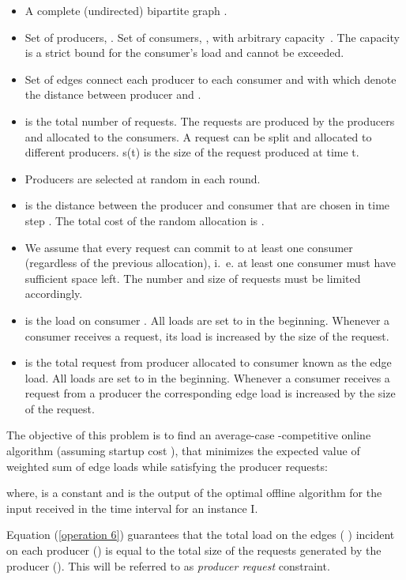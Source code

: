 \documentclass{llncs}
\begin{document}
\begin{itemize}
\item A complete (undirected) bipartite graph .
\item Set  of producers, . Set  of consumers, , with arbitrary capacity~. The capacity is a strict bound for the consumer's load and cannot be exceeded.
\item Set of edges  connect each producer to each consumer and with  which denote the distance between producer  and .
\item  is the total number of requests. The requests are produced by the producers and allocated to the consumers. A request can be split and allocated to different producers. s(t) is the size of the request produced at time t.
\item Producers are selected at random in each round.
\item  is the distance between the producer and consumer that are chosen in time step . The total cost of the random allocation is .
\item We assume that every request can commit to at least one consumer (regardless of the previous allocation), i.~e. at least one consumer must have sufficient space left. The number and size of requests must be limited accordingly.
\item  is the load on consumer . All loads  are set to  in the beginning. Whenever a consumer receives a request, its load is increased by the size of the request. 
\item  is the total request from producer  allocated to consumer  known as the edge load. All loads  are set to  in the beginning. Whenever a consumer receives a request from a producer the corresponding edge load is increased by the size of the request.

\end{itemize}

The objective of this problem is to find an average-case \cite{average-case} -competitive online algorithm (assuming startup cost ), that minimizes the expected value of weighted sum of edge loads while satisfying the producer requests:

 

where,  is a constant and  is the output of the optimal offline algorithm for the input received in the time interval  for an instance I.

Equation (\ref{operation 6}) guarantees that the total load on the edges \big(  \big) incident on each producer () is equal to the total size of the requests generated by the producer \big(\big). This will be referred to as \emph{producer request} constraint.
\end{document}
